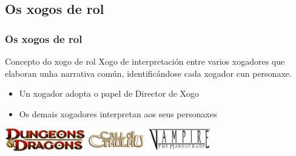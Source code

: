 \documentclass[12pt]{beamer}
\begin{document}
\subsection{Os xogos de rol}
\begin{frame}
\frametitle{Os xogos de rol}
\begin{block}{Concepto do xogo de rol}
Xogo de interpretación entre varios xogadores que elaboran unha narrativa común,
identificándose cada xogador cun personaxe.
\end{block}
\begin{itemize}
\item Un xogador adopta o papel de \alert{Director de Xogo}
\item Os demais xogadores interpretan aos seus personaxes
\end{itemize}

\includegraphics[height=1cm]{figuras/presentacion/dungeonsanddragons_logo.jpg}
\includegraphics[height=1cm]{figuras/presentacion/call-of-cthulhu-logo.png}
\includegraphics[height=1cm]{figuras/presentacion/Vampirethemasquerade-logo.png}
\end{frame}
\end{document}
